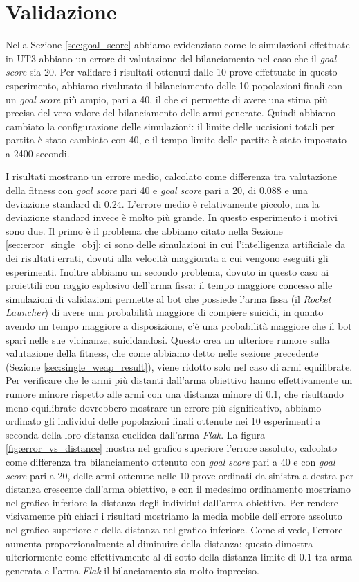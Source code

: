 \documentclass[12pt, italian]{toptesi}
\begin{document}
\section{Validazione}
Nella Sezione \ref{sec:goal_score} abbiamo evidenziato come le simulazioni effettuate in UT3 abbiano un errore di valutazione del bilanciamento nel caso che il \emph{goal score} sia 20.
Per validare i risultati ottenuti dalle 10 prove effettuate in questo esperimento, abbiamo rivalutato il bilanciamento delle 10 popolazioni finali con un \emph{goal score} più ampio, pari a 40, il che ci permette di avere una stima più precisa del vero valore del bilanciamento delle armi generate.
Quindi abbiamo cambiato la configurazione delle simulazioni: il limite delle uccisioni totali per partita è stato cambiato con 40, e il tempo limite delle partite è stato impostato a 2400 secondi.

I risultati mostrano un errore medio, calcolato come differenza tra valutazione della fitness con \emph{goal score} pari 40 e \emph{goal score} pari a 20, di $0.088$ e una deviazione standard di $0.24$.
L'errore medio è relativamente piccolo, ma la deviazione standard invece è molto più grande. 
In questo esperimento i motivi sono due.
Il primo è il problema che abbiamo citato nella Sezione \ref{sec:error_single_obj}: ci sono delle simulazioni in cui l'intelligenza artificiale da dei risultati errati, dovuti alla velocità maggiorata a cui vengono eseguiti gli esperimenti.
Inoltre abbiamo un secondo problema, dovuto in questo caso ai proiettili con raggio esplosivo dell'arma fissa: il tempo maggiore concesso alle simulazioni di validazioni permette al bot che possiede l'arma fissa (il \emph{Rocket Launcher}) di avere una probabilità maggiore di compiere suicidi, in quanto avendo un tempo maggiore a disposizione, c'è una probabilità maggiore che il bot spari nelle sue vicinanze, suicidandosi. Questo crea un ulteriore rumore sulla valutazione della fitness, che come abbiamo detto nelle sezione precedente (Sezione \ref{sec:single_weap_result}), viene ridotto solo nel caso di armi equilibrate.
Per verificare che le armi più distanti dall'arma obiettivo hanno effettivamente un rumore minore rispetto alle armi con una distanza minore di $0.1$, che risultando meno equilibrate dovrebbero mostrare un errore più significativo, abbiamo ordinato gli individui delle popolazioni finali ottenute nei 10 esperimenti a seconda della loro distanza euclidea dall'arma \emph{Flak}.
La figura \ref{fig:error_vs_distance} mostra nel grafico superiore l'errore assoluto, calcolato come differenza tra bilanciamento ottenuto con \emph{goal score} pari a 40 e con \emph{goal score} pari a 20, delle armi ottenute nelle 10 prove ordinati da sinistra a destra per distanza crescente dall'arma obiettivo, e con il medesimo ordinamento mostriamo nel grafico inferiore la distanza degli individui dall'arma obiettivo.
Per rendere visivamente più chiari i risultati mostriamo la media mobile dell'errore assoluto nel grafico superiore e della distanza nel grafico inferiore.
Come si vede, l'errore aumenta proporzionalmente al diminuire della distanza: questo dimostra ulteriormente come effettivamente al di sotto della distanza limite di $0.1$ tra arma generata e l'arma \emph{Flak} il bilanciamento sia molto impreciso.
\end{document}
